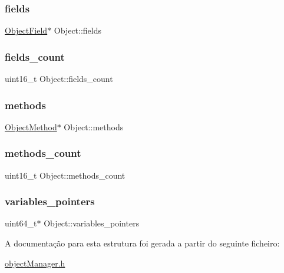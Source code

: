 \subsubsection{\texorpdfstring{fields}{fields}}
{\footnotesize\ttfamily \hyperlink{struct_object_field}{Object\+Field}$\ast$ Object\+::fields}

\hypertarget{struct_object_afd66bddbfa4612c4b925f2ca09d7c383}{}\label{struct_object_afd66bddbfa4612c4b925f2ca09d7c383} 
\subsubsection{\texorpdfstring{fields\+\_\+count}{fields\_count}}
{\footnotesize\ttfamily uint16\+\_\+t Object\+::fields\+\_\+count}

\hypertarget{struct_object_aecd81fad0869e3f7263cc910cd16864a}{}\label{struct_object_aecd81fad0869e3f7263cc910cd16864a} 
\subsubsection{\texorpdfstring{methods}{methods}}
{\footnotesize\ttfamily \hyperlink{struct_object_method}{Object\+Method}$\ast$ Object\+::methods}

\hypertarget{struct_object_ace96f6f6833031c2327e22f85f592347}{}\label{struct_object_ace96f6f6833031c2327e22f85f592347} 
\subsubsection{\texorpdfstring{methods\+\_\+count}{methods\_count}}
{\footnotesize\ttfamily uint16\+\_\+t Object\+::methods\+\_\+count}

\hypertarget{struct_object_a9ea1c3bc8e1735168f9b9175931420e3}{}\label{struct_object_a9ea1c3bc8e1735168f9b9175931420e3} 
\subsubsection{\texorpdfstring{variables\+\_\+pointers}{variables\_pointers}}
{\footnotesize\ttfamily uint64\+\_\+t$\ast$ Object\+::variables\+\_\+pointers}



A documentação para esta estrutura foi gerada a partir do seguinte ficheiro\+:\begin{DoxyCompactItemize}
\item 
\hyperlink{object_manager_8h}{object\+Manager.\+h}\end{DoxyCompactItemize}
